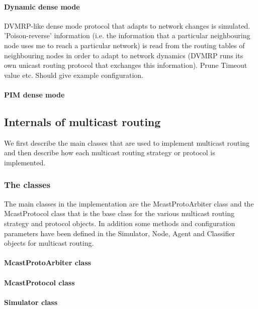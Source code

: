 \documentclass{article}
\begin{document}
\paragraph{Dynamic dense mode}
DVMRP-like dense mode protocol that
adapts to network changes is simulated.
'Poison-reverse' information
(i.e. the information that a particular neighbouring node
uses me to reach a particular network)
is read from the routing tables of neighbouring nodes
in order to adapt to network dynamics
(DVMRP runs its own unicast routing protocol
that exchanges this information).
Prune Timeout value etc.
Should give example configuration.

\paragraph{PIM dense mode}

\subsection{Internals of multicast routing}
\label{sec:mcast-internals}

We first describe the main classes that are
used to implement multicast routing and
then describe how each multicast routing strategy
or protocol is implemented.

\subsubsection{The classes}
The main classes in the implementation are
the McastProtoArbiter class and the McastProtocol class 
that is the base class for the
various multicast routing strategy and protocol objects.
In addition some methods and configuration parameters
have been defined in the Simulator, Node, Agent 
and Classifier objects for multicast routing.

\paragraph{McastProtoArbiter class}

\paragraph{McastProtocol class}

\paragraph{Simulator class}
\end{document}

